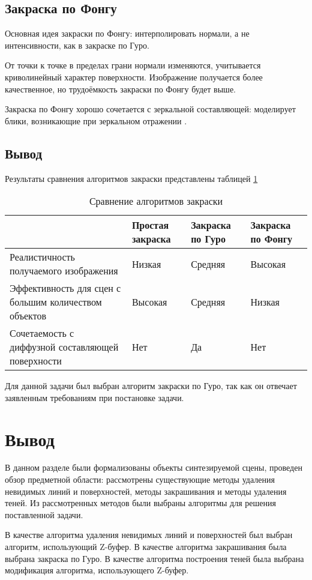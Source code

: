\subsection{Закраска по Фонгу}

Основная идея закраски по Фонгу: интерполировать нормали, а не интенсивности, как в закраске по Гуро.

От точки к точке в пределах грани нормали изменяются, учитывается криволинейный характер поверхности. Изображение получается более качественное, но трудоёмкость закраски по Фонгу будет выше.

Закраска по Фонгу хорошо сочетается с зеркальной составляющей: моделирует блики, возникающие при зеркальном отражении \cite{intuit}.

\subsection*{Вывод}

Результаты сравнения алгоритмов закраски представлены таблицей \ref{tbl:fill}

\begin{table}[H]
	\begin{center}
		\captionsetup{justification=raggedright, singlelinecheck=off}
		\caption{Сравнение алгоритмов закраски}
		\label{tbl:fill}
		\begin{tabularx}{\textwidth}{|p{3.5cm}|p{3.8cm}|p{3.8cm}|p{4.145cm}|}
			\hline
			&Простая закраска &Закраска по Гуро&Закраска по Фонгу\\ \hline
			Реалистичность получаемого изображения&Низкая&Средняя&Высокая\\ \hline
			Эффективность для сцен с большим количеством объектов&Высокая&Средняя&Низкая\\ \hline
			Сочетаемость с диффузной составляющей поверхности&Нет&Да&Нет\\ \hline
		\end{tabularx}
	\end{center}
\end{table}

Для данной задачи был выбран алгоритм закраски по Гуро, так как он отвечает заявленным требованиям при постановке задачи.

\section*{Вывод}

В данном разделе были формализованы объекты синтезируемой сцены, проведен обзор предметной области: рассмотрены существующие методы удаления невидимых линий и поверхностей, методы закрашивания и методы удаления теней. Из рассмотренных методов были выбраны алгоритмы для решения поставленной задачи.

В качестве алгоритма удаления невидимых линий и поверхностей был
выбран алгоритм, использующий Z-буфер. В качестве алгоритма закрашивания
была выбрана закраска по Гуро. В качестве алгоритма построения теней была выбрана модификация алгоритма, использующего Z-буфер.
